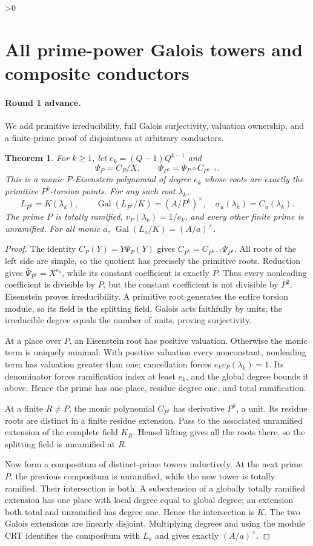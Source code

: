 \documentclass[10pt]{article}
\newtheorem{theorem}{Theorem}
\newcommand{\Gal}{\operatorname{Gal}}
\begin{document}
\ifnum\CRevisionRound>0
\section{All prime-power Galois towers and composite conductors}
\paragraph{Round 1 advance.}
We add primitive irreducibility, full Galois surjectivity, valuation
ownership, and a finite-prime proof of disjointness at arbitrary conductors.

\begin{theorem}
For $k\geq1$, let $e_k=(Q-1)Q^{k-1}$ and
\[
 \Psi_P=C_P/X,\qquad \Psi_{P^k}=\Psi_P\circ C_{P^{k-1}}.
\]
This is a monic $P$-Eisenstein polynomial of degree $e_k$ whose roots
are exactly the primitive $P^k$-torsion points. For any such root $\lambda_k$,
\[
 L_{P^k}=K(\lambda_k),\qquad
 \Gal(L_{P^k}/K)=(A/P^k)^\times,
 \quad \sigma_u(\lambda_k)=C_u(\lambda_k).
\]
The prime $P$ is totally ramified, $v_P(\lambda_k)=1/e_k$, and every
other finite prime is unramified. For all monic $a$,
$\Gal(L_a/K)=(A/a)^\times$.
\end{theorem}
\begin{proof}
The identity $C_P(Y)=Y\Psi_P(Y)$ gives
$C_{P^k}=C_{P^{k-1}}\Psi_{P^k}$. All roots of the left side are simple,
so the quotient has precisely the primitive roots. Reduction gives
$\overline\Psi_{P^k}=X^{e_k}$, while its constant coefficient is exactly
$P$. Thus every nonleading coefficient is divisible by $P$, but the
constant coefficient is not divisible by $P^2$. Eisenstein proves
irreducibility. A primitive root generates the entire torsion module, so
its field is the splitting field. Galois acts faithfully by units; the
irreducible degree equals the number of units, proving surjectivity.

At a place over $P$, an Eisenstein root has positive valuation. Otherwise
the monic term is uniquely minimal. With positive valuation every
nonconstant, nonleading term has valuation greater than one; cancellation
forces $e_kv_P(\lambda_k)=1$. Its denominator forces ramification index
at least $e_k$, and the global degree bounds it above. Hence the prime
has one place, residue degree one, and total ramification.

At a finite $R\ne P$, the monic polynomial $C_{P^k}$ has derivative
$P^k$, a unit. Its residue roots are distinct in a finite residue extension.
Pass to the associated unramified extension of the complete field $K_R$.
Hensel lifting gives all the roots there, so the splitting field is
unramified at $R$.

Now form a compositum of distinct-prime towers inductively. At the next
prime $P$, the previous compositum is unramified, while the new tower is
totally ramified. Their intersection is both. A subextension of a globally
totally ramified extension has one place with local degree equal to global
degree; an extension both total and unramified has degree one. Hence the
intersection is $K$. The two Galois extensions are linearly disjoint.
Multiplying degrees and using the module CRT identifies the compositum
with $L_a$ and gives exactly $(A/a)^\times$.
\end{proof}
\end{document}
